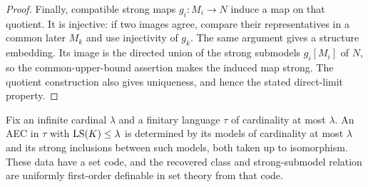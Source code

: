 \begin{proof}
Finally, compatible strong maps $g_i:M_i\longrightarrow N$
induce a map on that quotient. It is injective: if two images
agree, compare their representatives in a common later $M_k$
and use injectivity of $g_k$. The same argument gives a
structure embedding. Its image is the directed union of the
strong submodels $g_i[M_i]$ of $N$, so the
common-upper-bound assertion makes the induced map strong.
The quotient construction also gives uniqueness, and hence
the stated direct-limit property.
\end{proof}

\begin{lemma}
\label{found:small-code}
Fix an infinite cardinal $\lambda$ and a finitary language $\tau$ of
cardinality at most $\lambda$. An AEC in $\tau$ with
$\operatorname{LS}(K)\leq\lambda$ is determined by its models of cardinality at most
$\lambda$ and its strong inclusions between such models, both taken up to
isomorphism. These data have a set code, and the recovered class and
strong-submodel relation are uniformly first-order definable in set
theory from that code.
\end{lemma}

